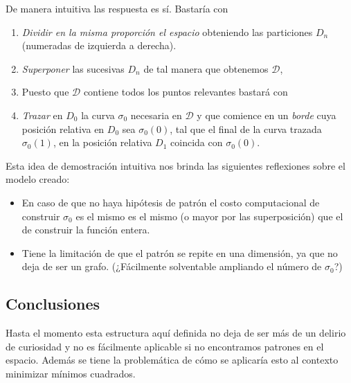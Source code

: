 De manera intuitiva las respuesta es sí. Bastaría con
\begin{enumerate}
 \item \textit{Dividir en la misma proporción el espacio} obteniendo las particiones $D_n$ (numeradas de izquierda a derecha).
 \item \textit{Superponer} las sucesivas $D_n$ de tal manera que obtenemos $\mathcal{D}$,
 \item Puesto que $\mathcal{D}$ contiene todos los puntos relevantes bastará con
 \item \textit{Trazar} en $D_0$ la curva $\sigma_0$ necesaria en  $\mathcal{D}$ y que 
  comience en un \textit{borde} cuya  posición relativa en $D_0$ sea 
  $\sigma_0(0)$, tal que el final de la curva trazada $\sigma_0(1)$, en la posición relativa 
  $D_1$  coincida con $\sigma_0(0)$. 
\end{enumerate}


Esta idea  de demostración intuitiva nos brinda las siguientes reflexiones 
sobre el modelo creado: 

\begin{itemize}
    \item En caso de que no haya hipótesis de patrón el costo computacional de construir 
    $\sigma_0$ es el mismo es el mismo (o mayor por las superposición) que el de construir la función entera. 

    \item Tiene la limitación de que el patrón se repite en una dimensión, ya que no deja de ser un grafo.
    (¿Fácilmente solventable  ampliando el número de $\sigma_0$?)
\end{itemize}

\subsection{Conclusiones}

Hasta el momento esta estructura aquí definida no deja de ser más de un delirio de curiosidad 
y no es fácilmente aplicable si no encontramos patrones en el espacio. 
Además se tiene la problemática de cómo se aplicaría esto al contexto
 minimizar mínimos cuadrados. 




